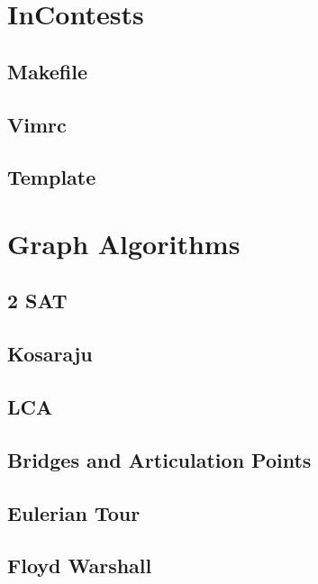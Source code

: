 \section{InContests}
\subsection{Makefile}
\raggedbottom
\hrulefill
\subsection{Vimrc}
\raggedbottom
\hrulefill
\subsection{Template}
\raggedbottom
\hrulefill

\section{Graph Algorithms}
\subsection{2 SAT}
\raggedbottom
\hrulefill
\subsection{Kosaraju}
\raggedbottom
\hrulefill
\subsection{LCA}
\raggedbottom
\hrulefill
\subsection{Bridges and Articulation Points}
\raggedbottom
\hrulefill
\subsection{Eulerian Tour}
\raggedbottom
\hrulefill
\subsection{Floyd Warshall}
\raggedbottom
\hrulefill
